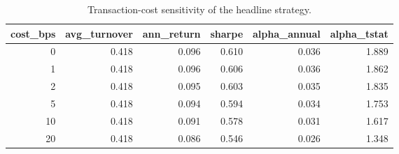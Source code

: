 \begin{table}[htbp]
\centering
\caption{Transaction-cost sensitivity of the headline strategy.}
\label{tab:costs}
\small
\begin{tabular}{rrrrrr}
\toprule
cost\_bps & avg\_turnover & ann\_return & sharpe & alpha\_annual & alpha\_tstat \\
\midrule
0 & 0.418 & 0.096 & 0.610 & 0.036 & 1.889 \\
1 & 0.418 & 0.096 & 0.606 & 0.036 & 1.862 \\
2 & 0.418 & 0.095 & 0.603 & 0.035 & 1.835 \\
5 & 0.418 & 0.094 & 0.594 & 0.034 & 1.753 \\
10 & 0.418 & 0.091 & 0.578 & 0.031 & 1.617 \\
20 & 0.418 & 0.086 & 0.546 & 0.026 & 1.348 \\
\bottomrule
\end{tabular}
\end{table}
